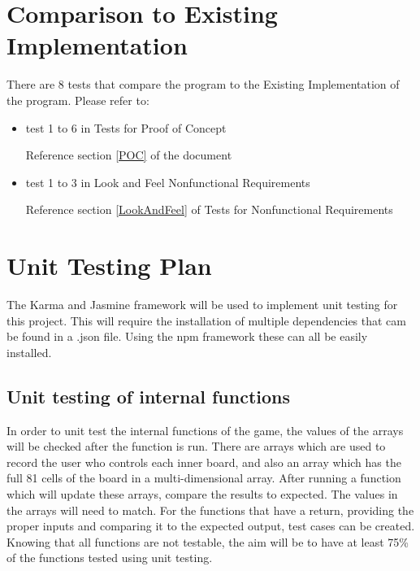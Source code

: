 \documentclass[12pt, titlepage]{article}
\begin{document}
\section{Comparison to Existing Implementation}
There are 8 tests that compare the program to the Existing Implementation of
the program. Please refer to:
\begin{itemize}

\item test 1 to 6 in Tests for Proof of Concept

Reference section \ref{POC} of the document
\item test 1 to 3 in Look and Feel Nonfunctional Requirements

Reference section \ref{LookAndFeel} of Tests for Nonfunctional Requirements

\end{itemize}		
				
\section{Unit Testing Plan}
The Karma and Jasmine framework will be used to implement unit testing for
this project. This will require the installation of multiple dependencies that
cam be found in a .json file. Using the npm framework these can all be easily
installed.
\subsection{Unit testing of internal functions}
In order to unit test the internal functions of the game, the values of the
arrays will be checked after the function is run. There are arrays which are
used to record the user who controls each inner board, and also an array which
has the full 81 cells of the board in a multi-dimensional array. After running
a function which will update these arrays, compare the results to expected.
The values in the arrays will need to match. For the functions that have a
return, providing the proper inputs and comparing it to the expected output,
test cases can be created. Knowing that all functions are not testable, the
aim will be to have at least 75\% of the functions tested using unit testing.
\end{document}
